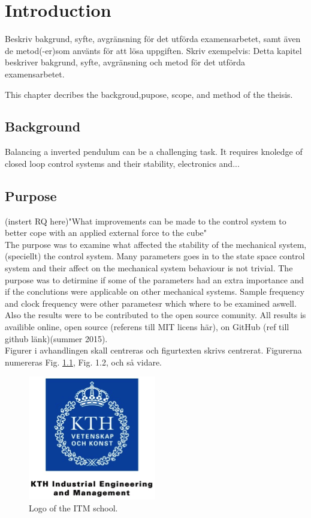 \documentclass[a4paper,11pt]{kth-mag}
\begin{document}
\mainmatter
\pagestyle{newchap}

\chapter{Introduction}
Beskriv bakgrund, syfte, avgränsning för det utförda examensarbetet, samt även de  metod(-er)som använts för att lösa uppgiften. Skriv exempelvis: Detta kapitel beskriver bakgrund, syfte, avgränsning och metod för det utförda examensarbetet.

This chapter decribes the backgroud,pupose, scope, and method of the theisis. 
\section{Background}
Balancing a inverted pendulum can be a challenging task. It requires knoledge of closed loop control systems and their stability, electronics and... 

\section{Purpose}

(instert RQ here)"What improvements can be made to the control system to better cope with an applied external force to the cube"  \\

\noindent{}The purpose was to examine what affected the stability of the mechanical system, (speciellt) the control system. Many parameters goes in to the state space control system and their affect on the mechanical system behaviour is not trivial. The purpose was to detirmine if some of the parameters had an extra importance and if the conclutions were applicable on other mechanical systems. Sample frequency and clock frequency were other parametesr which where to be examined aswell. Also the results were to be contributed to the open source comunity. All results is availible online, open source (referens till MIT licens här), on GitHub (ref till github länk)(summer 2015).\\  


Figurer i avhandlingen skall centreras och figurtexten skrivs centrerat. Figurerna numereras Fig. \ref{fig:kth_logo}, Fig. 1.2, och så vidare. 
\begin{figure}[htbp]
\begin{center}
\includegraphics{KTH_ITM_logo}
\caption{Logo of the ITM school.}
\label{fig:kth_logo}
\end{center}
\end{figure}
\end{document}
